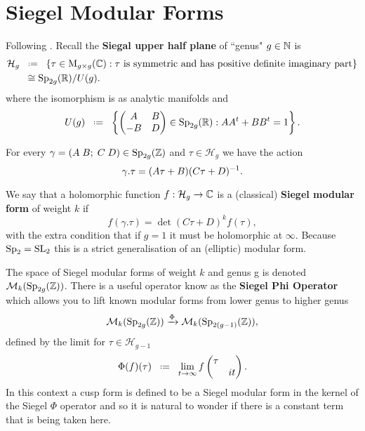 \section{Siegel Modular Forms}
Following \cite{bruinier123ModularForms2008}. Recall the \textbf{Siegal upper half plane} of ``genus" \(g\in \N\) is
\begin{equation*}
	\begin{aligned}
		\mathcal{H}_g &\defeq \{\tau \in \mathrm{M}_{g\times g}(\C) : \tau \text{ is symmetric and has positive definite imaginary part}\} \\
		&\;\; \cong \Sp_{2g}(\R) / U(g).
	\end{aligned}
\end{equation*}
where the isomorphism is as analytic manifolds  and 
\[U(g) \defeq \left\{\begin{pmatrix}
	A & B\\
	-B & D
\end{pmatrix}\in \Sp_{2g}(\R) : AA^t + BB^t = 1\right\}.\]

For every \(\gamma= (A \; B; \; C\; D) \in \Sp_{2g}(\Z)\) and \(\tau \in \mathcal{H}_g\) we have the action
\[\gamma.\tau = (A\tau + B)(C\tau + D)^{-1} .\]

We say that a holomorphic function \(f: \mathcal{H}_g \to \C\) is a (classical)\textbf{ Siegel modular form} of weight \(k\) if 
\[f(\gamma.\tau) = \det(C\tau + D)^kf(\tau),\]
with the extra condition that if \(g = 1\) it must be holomorphic at \(\infty\). Because \(\operatorname{Sp}_2 = \operatorname{SL}_2\) this is a strict generalisation of an (elliptic) modular form.

The space of Siegel modular forms of weight \(k\) and genus g is denoted \(\mathcal{M}_k(\Sp_{2g}(\Z))\). There is a useful operator know as the \textbf{Siegel Phi Operator} which allows you to lift known modular forms from lower genus to higher genus \cite[5]{bruinier123ModularForms2008}
\[\mathcal{M}_k(\Sp_{2g}(\Z)) \xrightarrow{\Phi} \mathcal{M}_{k}(\Sp_{2(g-1)}(\Z)),\]
defined by the limit for \(\tau\in \mathcal{H}_{g-1}\)
\[\Phi(f)(\tau) \defeq \lim_{t\to \infty} f\begin{pmatrix}
	\tau & \\
	& it 
\end{pmatrix}.\]
In this context a cusp form is defined to be a Siegel modular form in the kernel of the Siegel \(\Phi\) operator and so it is natural to wonder if there is a constant term that is being taken here. 

